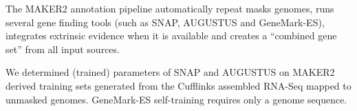 \documentclass[a4paper,10pt]{report}
\begin{document}

The MAKER2 annotation pipeline automatically repeat masks genomes, runs several gene finding tools (such as SNAP, AUGUSTUS and GeneMark-ES), integrates extrinsic evidence when it is available and creates a ``combined gene set'' from all input sources. 

We determined (trained) parameters of SNAP and AUGUSTUS on MAKER2 derived training sets generated from the Cufflinks assembled RNA-Seq mapped to unmasked genomes. GeneMark-ES self-training requires only a genome sequence.
\end{document}

